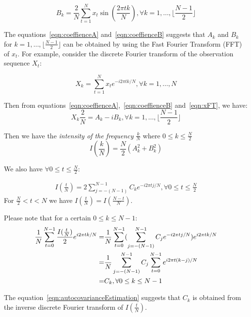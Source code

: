 \documentclass{article}
\begin{document}
 \begin{equation}\label{eqn:coeffienceB}
 B_k = \frac{2}{N}\sum_{t = 1}^{N}x_t\sin(\frac{2\pi tk}{N}), \forall k = 1,
 \ldots, \lfloor\frac{N-1}{2}\rfloor
 \end{equation}

The equations~\ref{eqn:coeffienceA} and~\ref{eqn:coeffienceB} suggests that
$A_k$ and $B_k$ for $k=1, \ldots, \lfloor\frac{N-1}{2}\rfloor$ can be obtained by
using the Fast Fourier Transform (FFT) of $x_t$. For example, consider the 
discrete Fourier transform of the observation sequence $X_t$:

\begin{equation}\label{eqn:xFT}
X_k = \sum_{t=1}^{N}x_t e^{-i2\pi tk/N}, \forall k = 1, \ldots, N
\end{equation}

Then from equations~\ref{eqn:coeffienceA},~\ref{eqn:coeffienceB}
and~\ref{eqn:xFT}, we have:
\begin{equation}
X_k\frac{2}{N} = A_k - iB_k, \forall k = 1, \ldots, \lfloor\frac{N-1}{2}\rfloor
\end{equation}

 Then we have the \textit{intensity of the frequency} $\frac{k}{N}$ where $0
 \leq k \leq \frac{N}{2}$
 \begin{equation}\label{eqn:intensity}
 I(\frac{k}{N}) = \frac{N}{2}(A_k^2 + B_k^2)
 \end{equation}

We also have $\forall 0\leq t\leq\frac{N}{2}$:

\begin{align}\label{eqn:intensityAutocovariance}
I(\frac{t}{N}) = 2 \sum_{j=-(N-1)}^{N-1}C_ke^{-i2\pi tj/N}, \forall
0\leq t\leq \frac{N}{2}
\end{align}
For $\frac{N}{2} < t < N$ we have $I(\frac{t}{N}) = I(\frac{N-t}{N})$.

Please note that for a certain $0\leq k \leq N-1$:
\begin{align}\label{eqn:autocovarianceEstimation}
\frac{1}{N}\sum_{t=0}^{N-1}\frac{I(\frac{t}{N})}{2}e^{i2\pi
tk/N}
=&\frac{1}{N}\sum_{t=0}^{N-1}(\sum_{j=-(N-1)}^{N-1}C_je^{-i2\pi tj/N})e^{i2\pi
tk/N} \notag \\
=& \frac{1}{N}\sum_{j=-(N-1)}^{N-1}C_j\sum_{t=0}^{N-1}e^{i2\pi t(k-j)/N} \notag
\\ =& C_k, \forall 0 \leq k \leq N-1
\end{align}

The equation~\ref{eqn:autocovarianceEstimation} suggests that $C_k$ is
obtained from the inverse discrete Fourier transform of $I(\frac{t}{N})$.
\end{document}
